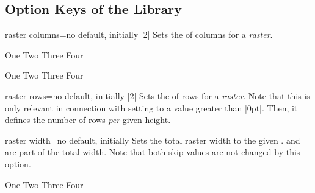 \clearpage
\subsection{Option Keys of the Library}\label{subsec:raster_options}

\begin{docTcbKey}[][doc new=2014-11-10]{raster columns}{=}{no default, initially |2|}
  Sets the  of columns for a \emph{raster}.
\begin{dispExample}
\begin{tcbitemize}[raster columns=3,
  size=small,colframe=red!50!black,colback=red!10!white]
  \tcbitem One
  \tcbitem Two
  \tcbitem Three
  \tcbitem Four
\end{tcbitemize}
\begin{tcbitemize}[raster columns=4,
  size=small,colframe=blue!50!black,colback=blue!10!white]
  \tcbitem One
  \tcbitem Two
  \tcbitem Three
  \tcbitem Four
\end{tcbitemize}
\end{dispExample}
\end{docTcbKey}

\begin{docTcbKey}[][doc new=2014-11-10]{raster rows}{=}{no default, initially |2|}
  Sets the  of rows for a \emph{raster}.
  Note that this is only relevant in connection with setting 
  to a value greater than |0pt|. Then, it defines the number of rows \emph{per} given
  height.
\end{docTcbKey}


\begin{docTcbKey}[][doc new=2014-11-10]{raster width}{=}{no default, initially }
  Sets the total raster width to the given .
   and  are part
  of the total width. Note that both skip values are not changed by this option.
\begin{dispExample}
\begin{tcbitemize}[raster width=\linewidth/2,
  size=small,colframe=red!50!black,colback=red!10!white]
  \tcbitem One
  \tcbitem Two
  \tcbitem Three
  \tcbitem Four
\end{tcbitemize}
\end{dispExample}
\end{docTcbKey}


